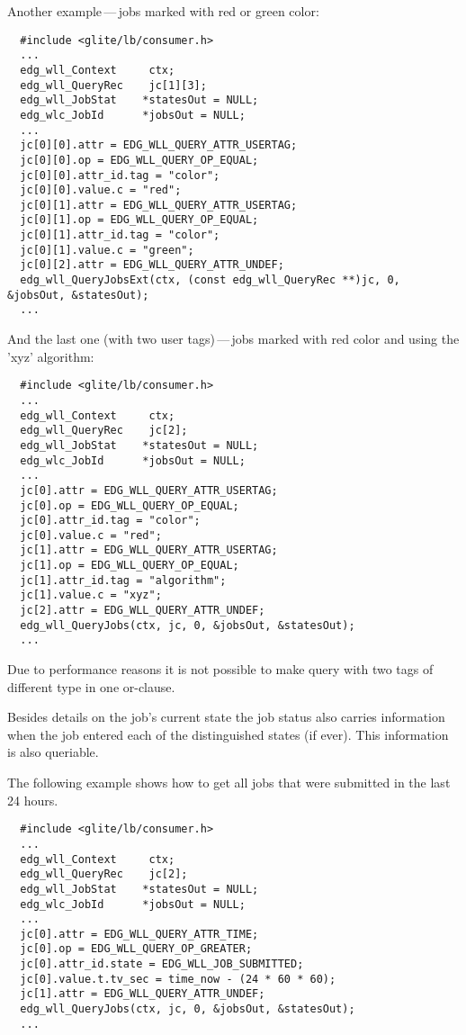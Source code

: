 Another example\,---\,jobs marked with red or green color:
\begin{verbatim}
  #include <glite/lb/consumer.h>
  ...
  edg_wll_Context     ctx;    
  edg_wll_QueryRec    jc[1][3];
  edg_wll_JobStat    *statesOut = NULL;
  edg_wlc_JobId      *jobsOut = NULL;
  ...
  jc[0][0].attr = EDG_WLL_QUERY_ATTR_USERTAG;
  jc[0][0].op = EDG_WLL_QUERY_OP_EQUAL;
  jc[0][0].attr_id.tag = "color";
  jc[0][0].value.c = "red";
  jc[0][1].attr = EDG_WLL_QUERY_ATTR_USERTAG;
  jc[0][1].op = EDG_WLL_QUERY_OP_EQUAL;
  jc[0][1].attr_id.tag = "color";
  jc[0][1].value.c = "green";
  jc[0][2].attr = EDG_WLL_QUERY_ATTR_UNDEF;
  edg_wll_QueryJobsExt(ctx, (const edg_wll_QueryRec **)jc, 0, &jobsOut, &statesOut);
  ...
\end{verbatim}

And the last one (with two user tags)\,---\,jobs marked with red color and using the 'xyz' algorithm:
\begin{verbatim}
  #include <glite/lb/consumer.h>
  ...
  edg_wll_Context     ctx;    
  edg_wll_QueryRec    jc[2];
  edg_wll_JobStat    *statesOut = NULL;
  edg_wlc_JobId      *jobsOut = NULL;
  ...
  jc[0].attr = EDG_WLL_QUERY_ATTR_USERTAG;
  jc[0].op = EDG_WLL_QUERY_OP_EQUAL;
  jc[0].attr_id.tag = "color";
  jc[0].value.c = "red";
  jc[1].attr = EDG_WLL_QUERY_ATTR_USERTAG;
  jc[1].op = EDG_WLL_QUERY_OP_EQUAL;
  jc[1].attr_id.tag = "algorithm";
  jc[1].value.c = "xyz";
  jc[2].attr = EDG_WLL_QUERY_ATTR_UNDEF;
  edg_wll_QueryJobs(ctx, jc, 0, &jobsOut, &statesOut);
  ...
\end{verbatim}

Due to performance reasons 
it is not possible to make query with two tags of different type in one
or-clause. 


Besides details on the job's current state the job status also carries
information when the job entered each of the distinguished states
(if ever).
This information is also queriable.


The following example shows how to get all jobs that were submitted in
the last 24 hours.
\begin{verbatim}
  #include <glite/lb/consumer.h>
  ...
  edg_wll_Context     ctx;    
  edg_wll_QueryRec    jc[2];
  edg_wll_JobStat    *statesOut = NULL;
  edg_wlc_JobId      *jobsOut = NULL;
  ...
  jc[0].attr = EDG_WLL_QUERY_ATTR_TIME;
  jc[0].op = EDG_WLL_QUERY_OP_GREATER;
  jc[0].attr_id.state = EDG_WLL_JOB_SUBMITTED;
  jc[0].value.t.tv_sec = time_now - (24 * 60 * 60);
  jc[1].attr = EDG_WLL_QUERY_ATTR_UNDEF;
  edg_wll_QueryJobs(ctx, jc, 0, &jobsOut, &statesOut);
  ...
\end{verbatim}

